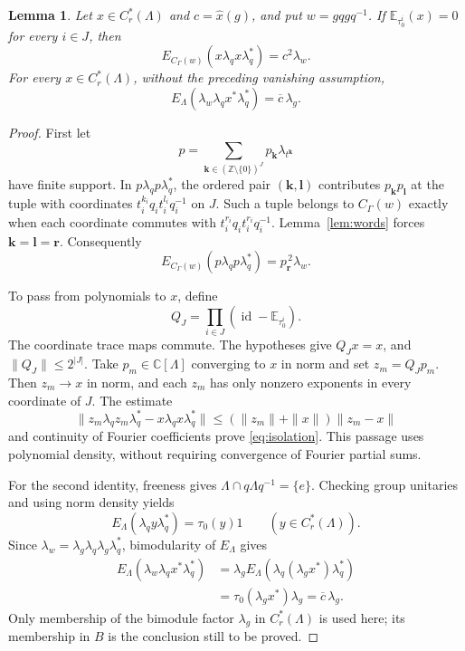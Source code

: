 \documentclass[11pt,letterpaper]{amsart}
\numberwithin{equation}{section}
\newtheorem{lemma}[theorem]{Lemma}
\theoremstyle{definition}
\theoremstyle{remark}
\newcommand{\Cr}{C_r^*}
\newcommand{\id}{\operatorname{id}}
\newcommand{\C}{\mathbb C}
\newcommand{\Z}{\mathbb Z}
\newcommand{\Etrace}[1]{\mathbb E_{\tau_0^{#1}}}
\begin{document}
\begin{lemma}\label{lem:coefficient}
Let $x\in\Cr(\Lambda)$ and $c=\widehat x(g)$, and put $w=gqgq^{-1}$.
If $\Etrace{i}(x)=0$ for every $i\in J$, then
\begin{equation}\label{eq:isolation}
 E_{C_\Gamma(w)}(x\lambda_qx\lambda_q^*)=c^2\lambda_w.
\end{equation}
For every $x\in\Cr(\Lambda)$, without the preceding vanishing
assumption,
\begin{equation}\label{eq:recovery}
 E_\Lambda(\lambda_w\lambda_qx^*\lambda_q^*)
 =\overline c\,\lambda_g.
\end{equation}
\end{lemma}
\begin{proof}
First let
\[
 p=\sum_{\boldsymbol k\in(\Z\setminus\{0\})^J}
        p_{\boldsymbol k}\lambda_{t^{\boldsymbol k}}
\]
have finite support. In $p\lambda_qp\lambda_q^*$, the ordered pair
$(\boldsymbol k,\boldsymbol l)$ contributes
$p_{\boldsymbol k}p_{\boldsymbol l}$ at the tuple with coordinates
$t_i^{k_i}q_it_i^{l_i}q_i^{-1}$ on $J$.
Such a tuple belongs to $C_\Gamma(w)$ exactly when each coordinate
commutes with $t_i^{r_i}q_it_i^{r_i}q_i^{-1}$.
Lemma~\ref{lem:words} forces
$\boldsymbol k=\boldsymbol l=\boldsymbol r$.
Consequently
\[
 E_{C_\Gamma(w)}(p\lambda_qp\lambda_q^*)
 =p_{\boldsymbol r}^{\,2}\lambda_w.
\]

To pass from polynomials to $x$, define
\begin{equation}\label{eq:Q}
 Q_J=\prod_{i\in J}(\id-\Etrace{i}).
\end{equation}
The coordinate trace maps commute. The hypotheses give $Q_Jx=x$,
and $\|Q_J\|\le2^{|J|}$.
Take $p_m\in\C[\Lambda]$ converging to $x$ in norm and set
$z_m=Q_Jp_m$. Then $z_m\to x$ in norm, and each $z_m$ has only
nonzero exponents in every coordinate of $J$.
The estimate
\[
 \|z_m\lambda_qz_m\lambda_q^*-x\lambda_qx\lambda_q^*\|
 \le(\|z_m\|+\|x\|)\|z_m-x\|
\]
and continuity of Fourier coefficients prove \eqref{eq:isolation}.
This passage uses polynomial density, without requiring convergence
of Fourier partial sums.

For the second identity, freeness gives
$\Lambda\cap q\Lambda q^{-1}=\{e\}$.
Checking group unitaries and using norm density yields
\[
 E_\Lambda(\lambda_qy\lambda_q^*)=\tau_0(y)1
 \qquad(y\in\Cr(\Lambda)).
\]
Since $\lambda_w=\lambda_g\lambda_q\lambda_g\lambda_q^*$,
bimodularity of $E_\Lambda$ gives
\[
 \begin{aligned}
 E_\Lambda(\lambda_w\lambda_qx^*\lambda_q^*)
 &=\lambda_g
     E_\Lambda(\lambda_q(\lambda_gx^*)\lambda_q^*)\\
 &=\tau_0(\lambda_gx^*)\lambda_g
 =\overline c\,\lambda_g .
 \end{aligned}
\]
Only membership of the bimodule factor $\lambda_g$ in $\Cr(\Lambda)$
is used here; its membership in $B$ is the conclusion still to be proved.
\end{proof}
\end{document}
